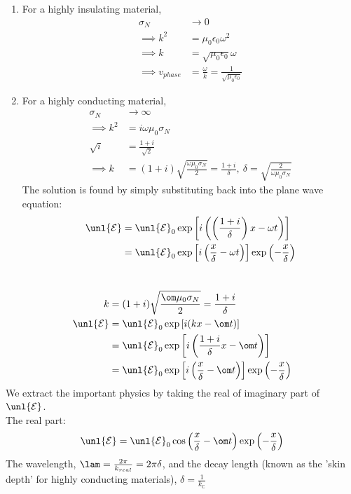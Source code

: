 \documentclass[a4paper, 11pt, normalem]{report}
\renewcommand\E{\mathcal{E}}
\newcommand\uE{\unl{\E}}
\newcommand\eno{\epsilon_0}
\begin{document}
\begin{enumerate}
    \item For a highly insulating material,
    \begin{align}
        \sigma_N &\to 0 \\
        \implies k^2 &= \mu_0\eno\omega^2 \\
        \implies k &= \sqrt{\mu_0\eno}\omega \\
        \implies v_{phase} &= \frac{\omega}{k} = \frac{1}{\sqrt{\mu_0\eno}}
    \end{align}
    \item For a highly conducting material,
    \begin{align}
        \sigma_N &\to \infty \\
        \implies k^2 &= i\omega\mu_0\sigma_N \\
        \sqrt{i} &= \frac{1 + i}{\sqrt{2}} \\
        \implies k &= (1 + i)\sqrt{\frac{\omega\mu_0\sigma_N}{2}} = \frac{1 + i}{\delta}, ~\delta = \sqrt{\frac{2}{\omega\mu_0\sigma_N}}
    \end{align}
    The solution is found by simply substituting back into the plane wave equation:
    \begin{align}
        \uE &= \uE_0\exp\left[i\left(\left(\frac{1 + i}{\delta}\right)x - \omega t\right)\right] \\
        &= \uE_0\exp\left[i\left(\frac{x}{\delta} - \omega t\right)\right]\exp\left(-\frac{x}{\delta}\right)
    \end{align}
\end{enumerate}

\chapter{}
\begin{align}
    k &= (1 + i)\sqrt{\frac{\om\mu_0\sigma_N}{2}} = \frac{1 + i}{\delta} \\
    \uE &= \uE_0 \exp\left[i(kx - \om t)\right] \\
    &= \uE_0\exp\left[i\left(\frac{1+i}{\delta}x - \om t\right)\right] \\
    &= \uE_0\exp\left[i\left(\frac{x}{\delta} - \om t\right)\right]\exp\left(-\frac{x}{\delta}\right)
\end{align}
We extract the important physics by taking the real of imaginary part of $\uE$.\\
The real part:
\begin{equation}
    \uE = \uE_0\cos\left(\frac{x}{\delta}- \om t\right)\exp\left(-\frac{x}{\delta}\right)
\end{equation}
The wavelength, $\lam = \frac{2\pi}{k_{real}} = 2\pi\delta$, and the decay length (known as the 'skin depth' for highly conducting materials), $\delta = \frac{1}{k_{\mathbb{C}}}$
\end{document}
